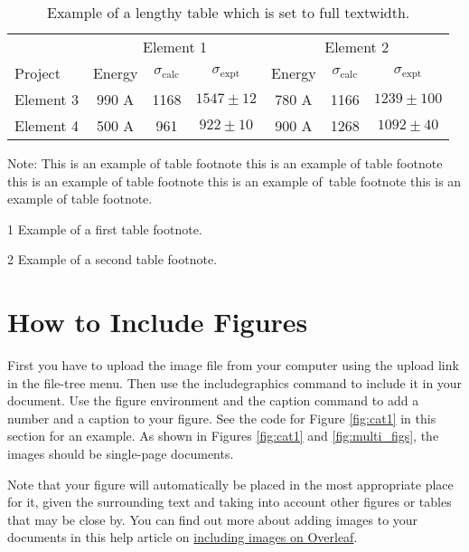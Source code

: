 \documentclass[12pt,a4paper]{article}
\begin{document}
\begin{table*}[!ht]
\caption{Example of a lengthy table which is set to full textwidth.\label{tab2}}
\tabcolsep=0pt
\begin{threeparttable}
\begin{tabular*}{\textwidth}{@{\extracolsep{\fill}}lcccccc@{\extracolsep{\fill}}}
\toprule
& \multicolumn{3}{c}{Element 1\tnote{1}} & \multicolumn{3}{c}{Element 2\tnote{2}} \\
\cmidrule(lr){2-4}\cmidrule(lr){5-7}
Project & Energy & $\sigma_{\mathrm{calc}}$ & $\sigma_{\mathrm{expt}}$ & Energy & $\sigma_{\mathrm{calc}}$ & $\sigma_{\mathrm{expt}}$ \\
\midrule
Element 3 & 990 A & 1168 & $1547\pm12$ & 780 A & 1166 & $1239\pm100$ \\
Element 4 & 500 A & 961 & $922\pm10$ & 900 A & 1268 & $1092\pm40$ \\
\bottomrule
\end{tabular*}
\begin{tablenotes}
\item Note: This is an example of table footnote this is an example of table footnote this is an example of table footnote this is an example of~table footnote this is an example of table footnote.
\item[1] Example of a first table footnote.
\item[2] Example of a second table footnote.
\end{tablenotes}
\end{threeparttable}
\end{table*}


\section{How to Include Figures}\label{sec6}

First you have to upload the image file from your computer using the upload link in the file-tree menu. Then use the includegraphics command to include it in your document. Use the figure environment and the caption command to add a number and a caption to your figure. See the code for Figure \ref{fig:cat1} in this section for an example. As shown in Figures \ref{fig:cat1} and \ref{fig:multi_figs}, the images should be single-page documents. 

Note that your figure will automatically be placed in the most appropriate place for it, given the surrounding text and taking into account other figures or tables that may be close by. You can find out more about adding images to your documents in this help article on \href{https://www.overleaf.com/learn/how-to/Including_images_on_Overleaf}{including images on Overleaf}.
\end{document}

